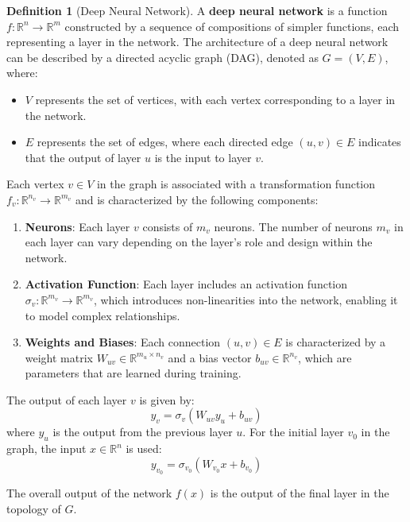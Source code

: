 \documentclass[11pt,a4paper]{article}
\theoremstyle{plain}
\theoremstyle{definition}
\newtheorem{definition}[theorem]{Definition}
\theoremstyle{remark}
\begin{document}
\begin{definition}[Deep Neural Network]

A \textbf{deep neural network} is a function \( f: \mathbb{R}^n \rightarrow \mathbb{R}^m \) constructed by a sequence of compositions of simpler functions, each representing a layer in the network. The architecture of a deep neural network can be described by a directed acyclic graph (DAG), denoted as \( G = (V, E) \), where:

\begin{itemize}
    \item \( V \) represents the set of vertices, with each vertex corresponding to a layer in the network.
    \item \( E \) represents the set of edges, where each directed edge \( (u, v) \in E \) indicates that the output of layer \( u \) is the input to layer \( v \).
\end{itemize}

Each vertex \( v \in V \) in the graph is associated with a transformation function \( f_v: \mathbb{R}^{n_v} \rightarrow \mathbb{R}^{m_v} \) and is characterized by the following components:

\begin{enumerate}
    \item \textbf{Neurons}: Each layer \( v \) consists of \( m_v \) neurons. The number of neurons \( m_v \) in each layer can vary depending on the layer's role and design within the network.
    \item \textbf{Activation Function}: Each layer includes an activation function \( \sigma_v: \mathbb{R}^{m_v} \rightarrow \mathbb{R}^{m_v} \), which introduces non-linearities into the network, enabling it to model complex relationships.
    \item \textbf{Weights and Biases}: Each connection \( (u, v) \in E \) is characterized by a weight matrix \( W_{uv} \in \mathbb{R}^{m_u \times n_v} \) and a bias vector \( b_{uv} \in \mathbb{R}^{n_v} \), which are parameters that are learned during training.
\end{enumerate}

The output of each layer \( v \) is given by:
\[
y_v = \sigma_v(W_{uv} y_u + b_{uv})
\]
where \( y_u \) is the output from the previous layer \( u \). For the initial layer \( v_0 \) in the graph, the input \( x \in \mathbb{R}^n \) is used:
\[
y_{v_0} = \sigma_{v_0}(W_{v_0} x + b_{v_0})
\]

The overall output of the network \( f(x) \) is the output of the final layer in the topology of \( G \).

\end{definition}
\end{document}
